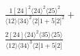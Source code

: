 \documentclass[varwidth, border=5pt]{standalone}
\begin{document}
\begin{my}
$\begin{gathered}
\scriptscriptstyle\frac{1[24]^2⟨24⟩^2⟨25⟩^2}{⟨12⟩⟨34⟩^2⟨2|1+5|2]^2}+\\
\scriptscriptstyle\frac{2[24]⟨24⟩^2⟨35⟩⟨25⟩}{⟨12⟩⟨34⟩^3⟨2|1+5|2]}\phantom{+}
\end{gathered}$
\end{my}
\end{document}
